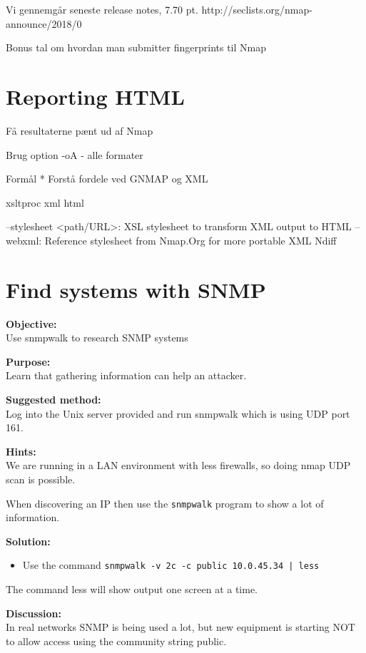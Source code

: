 \documentclass[a4paper,11pt,notitlepage]{report}
\begin{document}
Vi gennemgår seneste release notes, 7.70 pt.
http://seclists.org/nmap-announce/2018/0

Bonus tal om hvordan man submitter fingerprints til Nmap

\chapter{Reporting HTML}

Få resultaterne pænt ud af Nmap

Brug option -oA - alle formater

Formål
* Forstå fordele ved GNMAP og XML

xsltproc xml html

			 --stylesheet <path/URL>: XSL stylesheet to transform XML output to HTML
			 --webxml: Reference stylesheet from Nmap.Org for more portable XML
Ndiff


\chapter{Find systems with SNMP}
\label{ex:find-snmp}

{\bf Objective:}\\
Use snmpwalk to research SNMP systems

{\bf Purpose:}\\
Learn that gathering information can help an attacker.

{\bf Suggested method:} \\
Log into the Unix server provided and run snmpwalk which is using UDP port 161.

{\bf Hints:} \\
We are running in a LAN environment with less firewalls, so doing nmap UDP scan is possible.

When discovering an IP then use the \verb+snmpwalk+
  program to show a lot of information.


{\bf Solution:}\\
\begin{itemize}
\item Use the command \verb+snmpwalk -v 2c -c public 10.0.45.34 | less +\\
\end{itemize}

The command less will show output one screen at a time.

{\bf Discussion:}\\
In real networks SNMP is being used a lot, but new equipment is starting NOT to allow access using the community string public.
\end{document}
